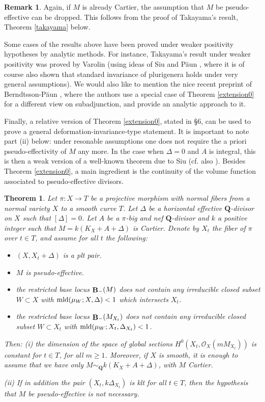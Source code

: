 \documentclass[11pt]{amsart}
\theoremstyle{plain}
\newtheorem{theoremalpha}{Theorem}
\theoremstyle{definition}
\newtheorem{remark}[theorem]{Remark}
\newcommand{\QQ}{\mathbf{Q}}
\newcommand{\OO}{\mathcal  {O}}
\DeclareMathOperator{\BB}{{\bf B}}
\begin{document}
\begin{remark}\label{simplification}
Again, if $M$ is already Cartier, the assumption that $M$ be pseudo-effective can be dropped. This 
follows from the proof of Takayama's result, Theorem \ref{takayama} below. 
\end{remark}

Some cases of the results above have been proved under weaker positivity hypotheses
by analytic methods. For instance, Takayama's result under weaker positivity was proved by Varolin \cite{varolin} (using ideas of Siu \cite{siu2} and P\u aun \cite{paun1}, where it is of course also 
shown that standard invariance of plurigenera holds under very general assumptions). We would also 
like to mention the nice recent preprint of Berndtsson-P\u aun \cite{bp}, where the authors use a special case of Theorem \ref{extension0} for a different view on subadjunction, and provide an analytic approach to it.

Finally, a relative version of Theorem \ref{extension0}, stated in \S6,  can be used to prove a general deformation-invariance-type statement. It is important to note part (ii) below: under resonable assumptions one does not require the a priori pseudo-effectivity 
of $M$ any more. In the case when $\Delta = 0$ and $A$ is integral, this is then a weak version of a well-known theorem due to Siu \cite{siu2} (cf. also \cite{paun1}). Besides Theorem \ref{extension0}, a main ingredient is the continuity of the volume function associated to pseudo-effective divisors.

\begin{theoremalpha}\label{fibration}
Let $\pi : X \rightarrow T$ be a projective morphism with normal fibers from a normal variety $X$ to a smooth curve $T$. Let $\Delta$ be a horizontal effective $\QQ$-divisor on $X$ such that $[\Delta] = 0$. Let $A$ be a $\pi$-big and nef $\QQ$-divisor and $k$ a positive integer such that $M=  k(K_X + A + \Delta)$ is Cartier. Denote by $X_t$ the fiber of $\pi$ over $t\in T$, and assume for all $t$ the following:
\begin{itemize}
\item $(X, X_t + \Delta) $ is a plt pair. 
\item $M$ is pseudo-effective.
\item the restricted base locus $\BB_{-} (M)$ does not contain any irreducible closed subset $W\subset X$ 
with ${\rm mld}(\mu_W ; X, \Delta) < 1$ which intersects $X_t$. 
\item the restricted base locus $\BB_{-} (M_{X_t})$ does not contain any irreducible closed subset 
$W\subset X_t$ 
with ${\rm mld}(\mu_W ; X_t, \Delta_{X_t}) < 1$.
\end{itemize}
Then: (i) the dimension of the space of global sections $H^0 (X_t, \OO_X (mM_{X_t}))$ is constant for $t \in T$, 
for all $m\ge 1$. Moreover, if $X$ is smooth, it is enough to assume that we have only $M\sim_{\QQ}  k(K_X + A + \Delta)$, with $M$ Cartier.

\noindent
(ii) If in addition the pair $(X_t, k\Delta_{X_t})$ is klt for all $t \in T$, then the hypothesis that $M$ be pseudo-effective is not necessary.
\end{theoremalpha}
\end{document}
